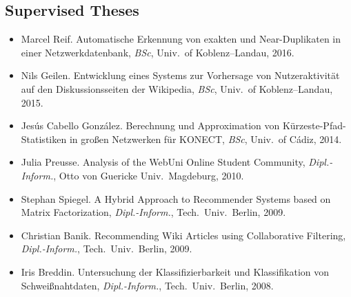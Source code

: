 \documentclass[line,mm]{res}
\newcounter{x}
\newcounter{y}
\newcounter{z}
\begin{document}
\begin{resume}
\section{Supervised Theses}
\begin{itemize}
\item 
  Marcel Reif.  Automatische Erkennung von exakten und
  Near-Duplikaten in einer Netzwerkdatenbank, \emph{BSc}, Univ.\ of Koblenz--Landau, 2016.
\item 
  Nils Geilen.  Entwicklung eines Systems zur Vorhersage von
  Nutzeraktivität auf den Diskussionsseiten der Wikipedia,
  \emph{BSc}, Univ.\ of Koblenz--Landau, 2015.
\item
  Jesús Cabello González.  Berechnung und Approximation von
  Kürzeste-Pfad-Statistiken in großen Netzwerken für KONECT,
  \emph{BSc}, Univ.\ of Cádiz, 2014. 
\item
  Julia Preusse. Analysis of the WebUni Online Student Community,
  \emph{Dipl.-Inform.}, Otto von Guericke Univ.\ Magdeburg, 2010.  
\item
  Stephan Spiegel.  A Hybrid Approach to Recommender Systems based
  on Matrix Factorization, \emph{Dipl.-Inform.}, Tech.\ Univ.\ Berlin, 2009.  
\item
  Christian Banik.  Recommending Wiki Articles using Collaborative
  Filtering, \emph{Dipl.-Inform.}, Tech.\ Univ.\ Berlin, 2009. 
\item
  Iris Breddin.  Untersuchung der Klassifizierbarkeit und
  Klassifikation von Schweißnahtdaten, \emph{Dipl.-Inform.}, Tech.\ Univ.\ Berlin, 2008.
\end{itemize}


\end{resume}
\end{document}
